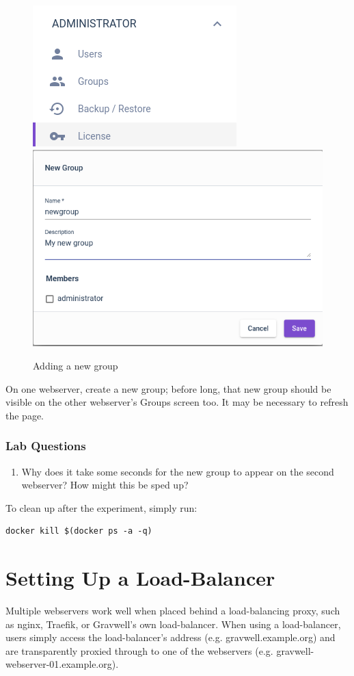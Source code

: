 \begin{figure}
\includegraphics[width=0.4\linewidth]{images/groups-menu.png}\includegraphics[width=0.5\linewidth]{images/groups-new.png}
\caption{Adding a new group}
\label{fig:webserver-lab-newgroup}
\end{figure}

On one webserver, create a new group; before long, that new group
should be visible on the other webserver's Groups screen too. It may be
necessary to refresh the page.

\subsubsection{Lab Questions}

\begin{enumerate}
\item
  Why does it take some seconds for the new group to appear on the
  second webserver? How might this be sped up?
\end{enumerate}

To clean up after the experiment, simply run:

\begin{Verbatim}[breaklines=true]
docker kill $(docker ps -a -q)
\end{Verbatim}



\section{Setting Up a Load-Balancer}
Multiple webservers work well when placed behind a load-balancing
proxy, such as nginx, Traefik, or Gravwell's own load-balancer. 
When using a load-balancer, users simply access
the load-balancer's address (e.g. gravwell.example.org) and are
transparently proxied through to one of the webservers (e.g.
gravwell-webserver-01.example.org).


